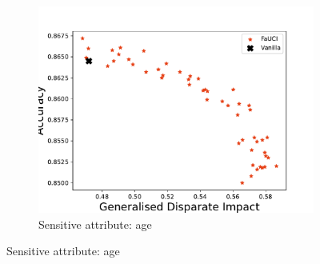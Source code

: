 \begin{figure}
\begin{subfigure}[]{\onethirdsize}
        \centering
        \includegraphics[width=\columnwidth]{figures/fauci/accuracy/disparate_impact_age}
        \caption{Sensitive attribute: age}
        \label{fig:di-age}
    \end{subfigure}
    \label{fig:di}


\end{figure}
